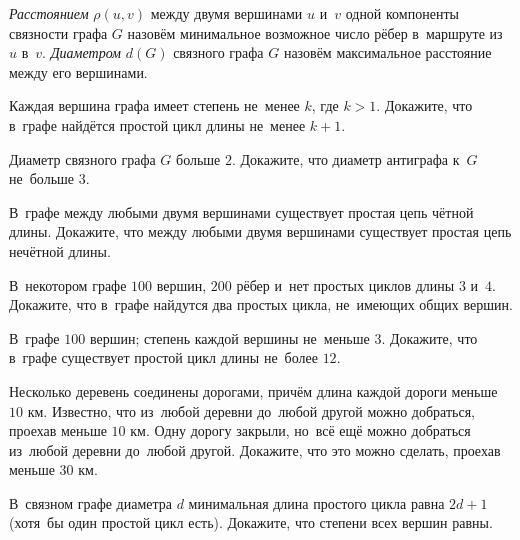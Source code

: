 


\emph{Расстоянием} $\rho(u, v)$ между двумя вершинами $u$ и~$v$ одной
компоненты связности графа $G$ назовём минимальное возможное число рёбер
в~маршруте из~$u$ в~$v$.
\emph{Диаметром} $d(G)$ связного графа $G$ назовём максимальное расстояние
между его вершинами.

\begin{problems}



\item
Каждая вершина графа имеет степень не~менее $k$, где $k > 1$.
Докажите, что в~графе найдётся простой цикл длины не~менее $k + 1$.

\item
Диаметр связного графа $G$ больше $2$.
Докажите, что диаметр антиграфа к~$G$ не~больше $3$.

\item
В~графе между любыми двумя вершинами существует простая цепь чётной длины.
Докажите, что между любыми двумя вершинами существует простая цепь нечётной
длины.

\item
В~некотором графе $100$ вершин, $200$ рёбер и~нет простых циклов длины $3$ и~$4$.
Докажите, что в~графе найдутся два простых цикла, не~имеющих общих вершин.

\item
В~графе $100$ вершин;
степень каждой вершины не~меньше $3$.
Докажите, что в~графе существует простой цикл длины не~более $12$.

\item
Несколько деревень соединены дорогами, причём длина каждой дороги меньше $10$
км.
Известно, что из~любой деревни до~любой другой можно добраться, проехав меньше
$10$ км.
Одну дорогу закрыли, но~всё ещё можно добраться из~любой деревни до~любой
другой.
Докажите, что это можно сделать, проехав меньше $30$ км.

\item
В~связном графе диаметра $d$ минимальная длина простого цикла равна $2d + 1$
(хотя~бы один простой цикл есть).
Докажите, что степени всех вершин равны.

\end{problems}

